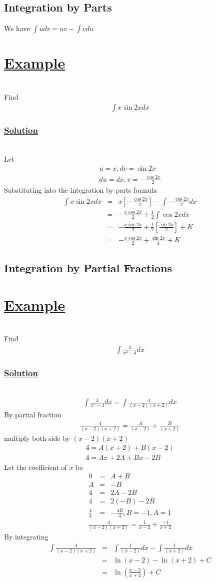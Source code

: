 \documentclass[12pt]{report}
\newcommand{\ubt}[1]{\textbf{\underline{#1}}}
\newcommand{\sps}{\\[0.2cm]}
\newcommand{\spn}[1]{\\[#1cm]}
\newcommand{\dsp}{\displaystyle}
\newcommand{\solution}{\subsubsection{\ubt{Solution}}{~}\spn{-1}}
\newcommand{\eg}{\section*{\ubt{Example}}{~}\spn{-1}}
\begin{document}
	\subsection{Integration by Parts}
	We have $\dsp \int udv = uv - \int v du$
	\eg
	Find
	\begin{eqnarray*}
		\int x \sin 2x dx
	\end{eqnarray*}
	\solution
	Let
	\begin{gather*}
		u=x, dv = \sin 2x\sps
		du =dx, v = -\frac{\cos 2x}{2}
	\end{gather*}
	Substituting into the integration by parts formula
	\begin{eqnarray*}
		\int x\sin 2x dx &=& x\left[-\frac{\cos 2x}{2}\right] - \int -\frac{\cos 2x}{2}dx\sps
		&=& - \frac{x\cos 2x}{2} + \frac{1}{2}\int\cos 2x dx\sps
		&=& -\frac{x\cos2x}{2} + \frac{1}{2}\left[\frac{\sin2x}{2}\right] + K\sps
		&=& -\frac{x\cos 2x}{2} + \frac{\sin2x}{4} + K
	\end{eqnarray*}
	
	\subsection{Integration by Partial Fractions}
	\eg
	Find
	\begin{eqnarray*}
		\int \frac{4}{x^2-4}dx
	\end{eqnarray*}
	\solution
	\begin{eqnarray*}
		\int \frac{4}{x^2-4}dx = \int\frac{4}{(x-2)(x+2)}dx
	\end{eqnarray*}
	By partial fraction
	\begin{eqnarray*}
		\frac{4}{(x-2)(x+2)} = \frac{A}{(x-2)} + \frac{B}{(x+2)}
	\end{eqnarray*}
	multiply both side by $(x-2)(x+2)$
	\begin{gather*}
		4 = A(x+2) + B(x-2)\sps
		4 = Ax + 2A + Bx - 2B
	\end{gather*}
	Let the coefficient of $x$ be
	\begin{eqnarray*}
		0 &=& A + B\sps
		A &=& - B\sps
		4 &=& 2A - 2B\sps
		4 &=&2(-B) - 2B\sps
		\frac{4}{4} &=& -\frac{4B}{4}, B=-1, A=1
	\end{eqnarray*}
	\begin{eqnarray*}
		\frac{4}{(x-2)(x+2)} = \frac{1}{x-2}+ \frac{-1}{x+2}
	\end{eqnarray*}
	By integrating
	\begin{eqnarray*}
		\int \frac{4}{(x-2)(x+2)} &=& \int \frac{1}{(x-2)}dx - \int\frac{1}{(x+2)}dx\sps
		&=& \ln(x-2) - \ln(x+2) + C\sps
		&=& \ln\left(\frac{x-2}{x+2}\right) + C
	\end{eqnarray*}
	
\end{document}
